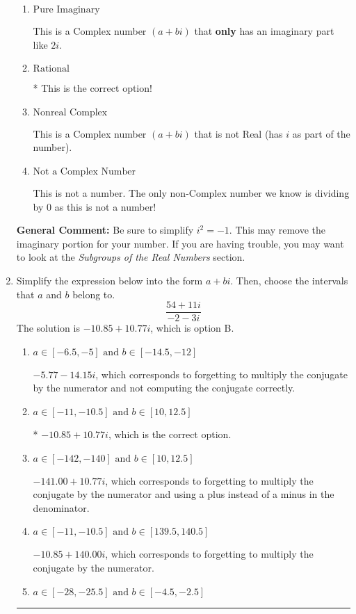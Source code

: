 \documentclass{extbook}[14pt]
\newcommand{\litem}[1]{\item #1

\rule{\textwidth}{0.4pt}}
\begin{document}
\begin{enumerate}
{\begin{enumerate}[label=\Alph*.]
These cannot be written as a fraction of Integers. Remember: $\pi$ is not an Integer!
\item \( \text{Pure Imaginary} \)

This is a Complex number $(a+bi)$ that \textbf{only} has an imaginary part like $2i$.
\item \( \text{Rational} \)

* This is the correct option!
\item \( \text{Nonreal Complex} \)

This is a Complex number $(a+bi)$ that is not Real (has $i$ as part of the number).
\item \( \text{Not a Complex Number} \)

This is not a number. The only non-Complex number we know is dividing by 0 as this is not a number!
\end{enumerate}

\textbf{General Comment:} Be sure to simplify $i^2 = -1$. This may remove the imaginary portion for your number. If you are having trouble, you may want to look at the \textit{Subgroups of the Real Numbers} section.
}
\litem{
Simplify the expression below into the form $a+bi$. Then, choose the intervals that $a$ and $b$ belong to.
\[ \frac{54 + 11 i}{-2 - 3 i} \]
The solution is \( -10.85  + 10.77 i \), which is option B.\begin{enumerate}[label=\Alph*.]
\item \( a \in [-6.5, -5] \text{ and } b \in [-14.5, -12] \)

 $-5.77  - 14.15 i$, which corresponds to forgetting to multiply the conjugate by the numerator and not computing the conjugate correctly.
\item \( a \in [-11, -10.5] \text{ and } b \in [10, 12.5] \)

* $-10.85  + 10.77 i$, which is the correct option.
\item \( a \in [-142, -140] \text{ and } b \in [10, 12.5] \)

 $-141.00  + 10.77 i$, which corresponds to forgetting to multiply the conjugate by the numerator and using a plus instead of a minus in the denominator.
\item \( a \in [-11, -10.5] \text{ and } b \in [139.5, 140.5] \)

 $-10.85  + 140.00 i$, which corresponds to forgetting to multiply the conjugate by the numerator.
\item \( a \in [-28, -25.5] \text{ and } b \in [-4.5, -2.5] \)


\end{enumerate}}
\end{enumerate}
\end{document}

